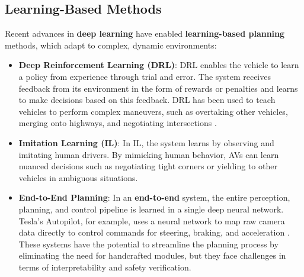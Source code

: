 \documentclass[12pt,a4paper]{article}
\begin{document}
\subsection{Learning-Based Methods}
Recent advances in \textbf{deep learning} have enabled \textbf{learning-based planning} methods, which adapt to complex, dynamic environments:
\begin{itemize}
    \item \textbf{Deep Reinforcement Learning (DRL)}: DRL enables the vehicle to learn a policy from experience through trial and error. The system receives feedback from its environment in the form of rewards or penalties and learns to make decisions based on this feedback. DRL has been used to teach vehicles to perform complex maneuvers, such as overtaking other vehicles, merging onto highways, and negotiating intersections \cite{aradi2020survey}.
    \item \textbf{Imitation Learning (IL)}: In IL, the system learns by observing and imitating human drivers. By mimicking human behavior, AVs can learn nuanced decisions such as negotiating tight corners or yielding to other vehicles in ambiguous situations.
    \item \textbf{End-to-End Planning}: In an \textbf{end-to-end} system, the entire perception, planning, and control pipeline is learned in a single deep neural network. Tesla’s Autopilot, for example, uses a neural network to map raw camera data directly to control commands for steering, braking, and acceleration \cite{tesla2024occupancy}. These systems have the potential to streamline the planning process by eliminating the need for handcrafted modules, but they face challenges in terms of interpretability and safety verification.
\end{itemize}
\end{document}
